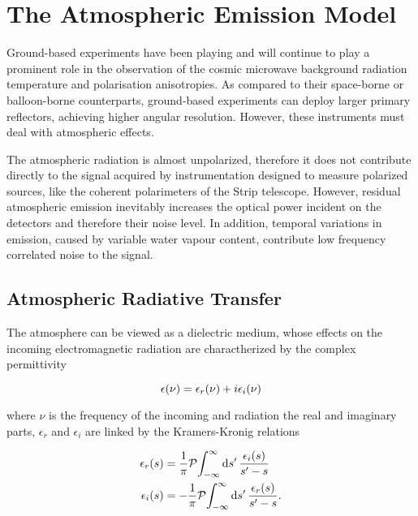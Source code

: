 \chapter{The Atmospheric Emission Model}\label{ch:atm_model}

Ground-based experiments have been playing and will continue to play a
prominent role in the observation of the cosmic microwave background
radiation temperature and polarisation anisotropies. As compared to
their space-borne or balloon-borne counterparts, ground-based experiments
can deploy larger primary reflectors, achieving higher angular resolution.
However, these instruments must deal with atmospheric effects.

The atmospheric radiation is almost unpolarized, therefore it does not
contribute directly to the signal acquired by instrumentation designed to
measure polarized sources, like the coherent polarimeters of the Strip
telescope. However, residual atmospheric emission inevitably increases the
optical power incident on the detectors and therefore their noise level. In
addition, temporal variations in emission, caused by variable water vapour
content, contribute low frequency correlated noise to the signal.

\section{Atmospheric Radiative Transfer}

The atmosphere can be viewed as a dielectric medium, whose effects on the
incoming electromagnetic radiation are charactherized by the complex permittivity

\begin{equation}
        \epsilon\qty(\nu) = \epsilon_r\qty(\nu) + i\epsilon_i\qty(\nu)
\end{equation}

where $\nu$ is the frequency of the incoming and radiation the real and
imaginary parts, $\epsilon_r$ and $\epsilon_i$ are linked by the
Kramers-Kronig relations

\begin{align}
        \epsilon_r\qty(s) & = \frac{1}{\pi}
        \principalvalue{\int^\infty_{-\infty}\dd{s'}
        \frac{\epsilon_i\qty(s)}{s' - s}} \label{eq:kk_relations_1} \\
        \epsilon_i\qty(s) & = -\frac{1}{\pi}
        \principalvalue{\int^\infty_{-\infty}\dd{s'}
        \frac{\epsilon_r\qty(s)}{s' - s}} \label{eq:kk_relations_2}.
\end{align}

